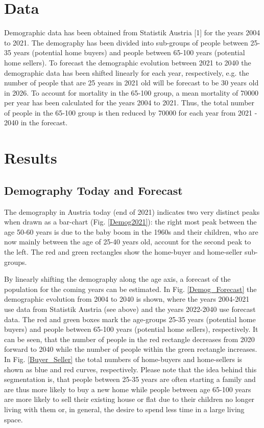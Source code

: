 \documentclass[11pt, a4paper, twocolumn]{article}
\begin{document}
\section{Data}

Demographic data has been obtained from Statistik Austria [1] for the years 2004 to 2021. The demography has been divided into sub-groups of people between 25-35 years (potential home buyers) and people between 65-100 years (potential home sellers). To forecast the demographic evolution between 2021 to 2040 the demographic data has been shifted linearly for each year, respectively, e.g. the number of people that are 25 years in 2021 old will be forecast to be 30 years old in 2026. To account for mortality in the 65-100 group, a mean mortality of 70000 per year has been calculated for the years 2004 to 2021. Thus, the total number of people in the 65-100 group is then reduced by 70000 for each year from 2021 - 2040 in the forecast.


\section{Results}

\subsection*{Demography Today and Forecast}
The demography in Austria today (end of 2021) indicates two very distinct peaks when drawn as a bar-chart (Fig. \ref{Demog2021}): the right most peak between the age 50-60 years is due to the baby boom in the 1960s and their children, who are now mainly between the age of 25-40 years old, account for the second peak to the left. The red and green rectangles show the home-buyer and home-seller sub-groups.

By linearly shifting the demography along the age axis, a forecast of the population for the coming years can be estimated. In Fig. \ref{Demog_Forecast} the demographic evolution from 2004 to 2040 is shown, where the years 2004-2021 use data from Statistik Austria (see above) and the years 2022-2040 use forecast data. The red and green boxes mark the age-groups 25-35 years (potential home buyers) and people between 65-100 years (potential home sellers), respectively. It can be seen, that the number of people in the red rectangle decreases from 2020 forward to 2040 while the number of people within the green rectangle increases. In Fig. \ref{Buyer_Seller} the total numbers of home-buyers and home-sellers is shown as blue and red curves, respectively. Please note that the idea behind this segmentation is, that people between 25-35 years are often starting a family and are thus more likely to buy a new home while people between age 65-100 years are more likely to sell their existing house or flat due to their children no longer living with them or, in general, the desire to spend less time in a large living space.
\end{document}

